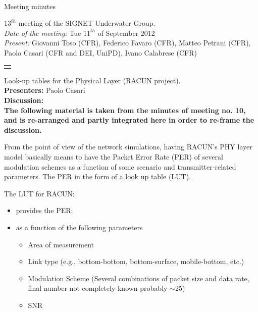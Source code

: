 \documentclass[11pt,journal,draftclsnofoot,onecolumn,twoside,letterpaper]{IEEEtran}
\theoremstyle{definition} \newtheorem{definition}[]{Definition}
\theoremstyle{theorem} \newtheorem{theorem}[]{Theorem}
\begin{document}
\pagestyle{empty}

\begin{Large} \\ \end{Large}
\begin{large} {Meeting minutes} \end{large}

\vspace{0.8cm}

 $13^{th}$ meeting of the SIGNET Underwater Group.\\
{\it Date of the meeting: } Tue $11^{th}$ of September $2012$\\
{\it Present: } Giovanni Toso (CFR), Federico Favaro (CFR), Matteo Petrani (CFR), Paolo Casari (CFR and DEI, UniPD), Ivano Calabrese (CFR)\\

\vspace{0.5cm}

\begin{tabular}{p{}}
 \hline \\
\end{tabular}


 Look-up tables for the Physical Layer (RACUN project).\\
{\bf Presenters:} Paolo Casari\\

{\bf Discussion:}\\

\textbf{The following material is taken from the minutes of meeting no. 10, and is re-arranged and partly integrated here in order to re-frame the discussion.}

From the point of view of the network simulations, having RACUN's PHY layer model basically means to have the Packet Error Rate (PER) of several modulation schemes as a function of some scenario and transmitter-related parameters. The PER in the form of a look up table (LUT).

The LUT for RACUN:
\begin{itemize}
  \item provides the PER;
  \item as a function of the following parameters
    \begin{itemize}
      \item Area of measurement
      \item Link type (e.g., bottom-bottom, bottom-surface, mobile-bottom, etc.)
      \item Modulation Scheme (Several combinations of packet size and data rate, final number not completely known probably $\sim$25)
      \item SNR
    \end{itemize}
\end{itemize}
\end{document}

